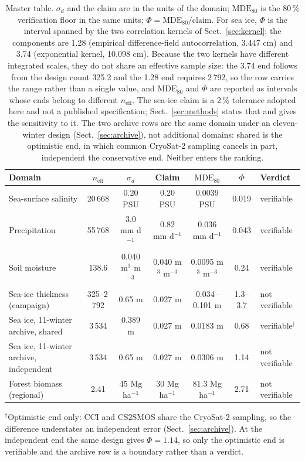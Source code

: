 \documentclass[preprint,12pt,authoryear]{elsarticle}
\begin{document}
\begin{table}[t]
\caption{Master table. $\sigma_d$ and the claim are in the units of the domain; $\mathrm{MDE}_{80}$ is the 80\,\% verification floor in the same units; $\Phi = \mathrm{MDE}_{80}/\mathrm{claim}$. For sea ice, $\Phi$ is the interval spanned by the two correlation kernels of
Sect.~\ref{sec:kernel}; the components are 1.28 (empirical difference-field
autocorrelation, 3.447 cm) and 3.74 (exponential kernel, 10.098 cm). Because the two
kernels have different integrated scales, they do not share an effective sample size:
the 3.74 end follows from the design count 325.2 and the 1.28 end requires 2\,792, so
the row carries the range rather than a single value, and $\mathrm{MDE}_{80}$ and
$\Phi$ are reported as intervals whose ends belong to different $n_{\mathrm{eff}}$.
The sea-ice claim is a 2\,\% tolerance adopted here and not a published
specification; Sect.~\ref{sec:methods} states that and gives the sensitivity to it. The
two archive rows are the same domain under an eleven-winter
design (Sect.~\ref{sec:archive}), not additional domains: shared is the optimistic
end, in which common CryoSat-2 sampling cancels in part, independent the conservative
end. Neither enters the ranking.}
\label{tab:master}
\footnotesize
\setlength{\tabcolsep}{2pt}
\begin{tabular}{@{}>{\raggedright\arraybackslash}p{2.0cm}ccccc>{\raggedright\arraybackslash}p{1.7cm}@{}}
\toprule
Domain & $n_{\mathrm{eff}}$ & $\sigma_d$ & Claim & $\mathrm{MDE}_{80}$ & $\Phi$ & Verdict \\
\midrule
Sea-surface salinity & 20\,668 & 0.20 PSU & 0.20 PSU & 0.0039 PSU & 0.019 & verifiable \\
Precipitation & 55\,768 & 3.0 mm d$^{-1}$ & 0.82 mm d$^{-1}$ & 0.036 mm d$^{-1}$ & 0.043 & verifiable \\
Soil moisture & 138.6 & 0.040 m$^3$ m$^{-3}$ & 0.040 m$^3$ m$^{-3}$ & 0.0095 m$^3$ m$^{-3}$ & 0.24 & verifiable \\
Sea-ice thickness (campaign) & 325--2\,792 & 0.65 m & 0.027 m & 0.034--0.101 m & 1.3--3.7 & not verifiable \\
Sea ice, 11-winter archive, shared & 3\,534 & 0.389 m & 0.027 m & 0.0183 m & 0.68 & verifiable$^{\dagger}$ \\
Sea ice, 11-winter archive, independent & 3\,534 & 0.65 m & 0.027 m & 0.0306 m & 1.14 & not verifiable \\
Forest biomass (regional) & 2.41 & 45 Mg ha$^{-1}$ & 30 Mg ha$^{-1}$ & 81.3 Mg ha$^{-1}$ & 2.71 & not verifiable \\
\bottomrule
\end{tabular}

\vspace{2pt}
{\scriptsize $^{\dagger}$Optimistic end only: CCI and CS2SMOS share the CryoSat-2 sampling, so the difference understates an independent error (Sect.~\ref{sec:archive}). At the independent end the same design gives $\Phi = 1.14$, so only the optimistic end is verifiable and the archive row is a boundary rather than a verdict.}
\end{table}
\end{document}

